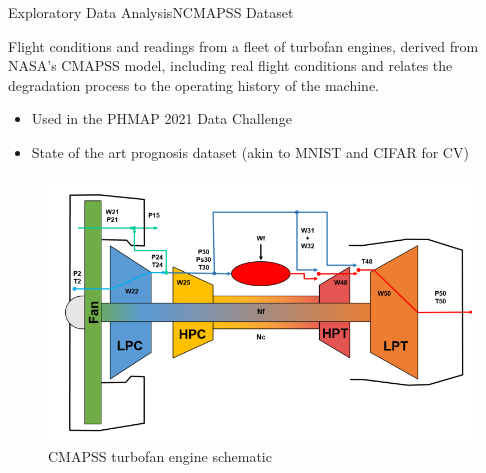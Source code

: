 \documentclass{beamer}
\begin{document}
        \begin{frame}{Exploratory Data Analysis}{NCMAPSS Dataset}

            Flight conditions and readings from a fleet of turbofan engines,
            derived from NASA's CMAPSS model, including real flight conditions and relates the degradation process to the operating history of the machine. \cite{arias2021aircraft}
            \begin{itemize}
                \item Used in the PHMAP 2021 Data Challenge \cite{phm-conference}
                \item State of the art prognosis dataset (akin to MNIST and CIFAR for CV)
            \end{itemize}

            \begin{figure}[!htbp]
                \centering
                \includegraphics[scale=0.35]{cmapss_turbofan.png}
                \caption{CMAPSS turbofan engine schematic}
            \end{figure}
        \end{frame}
\end{document}
